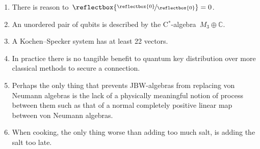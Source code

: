 \documentclass{article}
\newcommand\rfrac[2]{\reflectbox{\nicefrac{\reflectbox{\ensuremath{#1}}}{\reflectbox{\ensuremath{#2}}}}}
\begin{document}
\begin{enumerate}
\item
    There is reason to~$\rfrac{0}{0}=0$.
\item
    An unordered pair of qubits is described
        by the C$^*$-algebra~$M_3 \oplus \mathbb{C}$.
\item
    A Kochen--Specker system has at least 22 vectors.
\item
    In practice there is no tangible benefit
        to quantum key distribution over more
            classical methods to secure a connection.
\item
    Perhaps the only thing that prevents JBW-algebras from replacing
            von Neumann algebras is
            the lack of a physically meaningful notion
            of process between them
            such as that of a normal completely positive linear map
            between von Neumann algebras.
\item
    When cooking,
        the only thing worse than adding too much salt,
        is adding the salt too late.
\end{enumerate}
\end{document}

